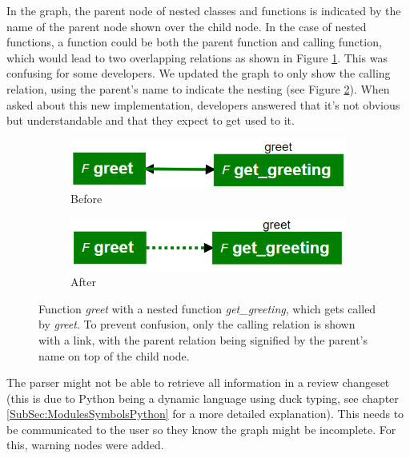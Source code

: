 \documentclass[a4paper,11pt,twoside]{article}
\theoremstyle{definition} %
\begin{document}
In the graph, the parent node of nested classes and functions is indicated by the name of the parent node shown over the child node. In the case of nested functions, a function could be both the parent function and calling function, which would lead to two overlapping relations as shown in Figure \ref{fig:nested-function-links-initial}. This was confusing for some developers. We updated the graph to only show the calling relation, using the parent’s name to indicate the nesting (see Figure \ref{fig:nested-funtion-links-final}). When asked about this new implementation, developers answered that it’s not obvious but understandable and that they expect to get used to it. 

\begin{figure}[h]
\centering
\begin{subfigure}{.5\textwidth}
  \centering
  \includegraphics[width=0.9\linewidth]{Subfigures/nested_function_initial.PNG}
  \caption{Before}
  \label{fig:nested-function-links-initial}
\end{subfigure}%
\begin{subfigure}{.5\textwidth}
  \centering
  \includegraphics[width=0.9\linewidth]{Subfigures/nested_function_final.PNG}
  \caption{After}
  \label{fig:nested-funtion-links-final}
\end{subfigure}
\caption{Function \textit{greet} with a nested function \textit{get\_greeting}, which gets called by \textit{greet}. To prevent confusion, only the calling relation is shown with a link, with the parent relation being signified by the parent's name on top of the child node.}
\label{fig:nestedFunctionLinkComparison}
\end{figure}

The parser might not be able to retrieve all information in a review changeset (this is due to Python being a dynamic language using duck typing, see chapter \ref{SubSec:ModulesSymbolsPython} for a more detailed explanation). This needs to be communicated to the user so they know the graph might be incomplete. For this, warning nodes were added.
\end{document}
